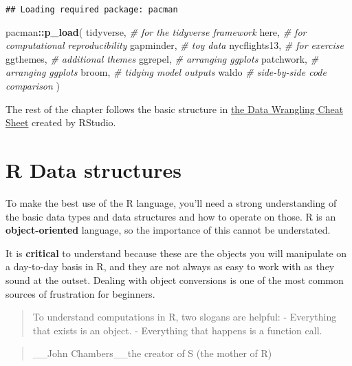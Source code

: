 \documentclass[
]{book}
\newenvironment{Shaded}{\begin{snugshade}}{\end{snugshade}}
\newcommand{\CommentTok}[1]{\textcolor[rgb]{0.56,0.35,0.01}{\textit{#1}}}
\newcommand{\KeywordTok}[1]{\textcolor[rgb]{0.13,0.29,0.53}{\textbf{#1}}}
\newcommand{\NormalTok}[1]{#1}
\newcommand{\OperatorTok}[1]{\textcolor[rgb]{0.81,0.36,0.00}{\textbf{#1}}}
\begin{document}
\begin{verbatim}
## Loading required package: pacman
\end{verbatim}

\begin{Shaded}
\begin{Highlighting}[]
\NormalTok{pacman}\OperatorTok{::}\KeywordTok{p\_load}\NormalTok{(}
\NormalTok{  tidyverse, }\CommentTok{\# for the tidyverse framework}
\NormalTok{  here, }\CommentTok{\# for computational reproducibility}
\NormalTok{  gapminder, }\CommentTok{\# toy data}
\NormalTok{  nycflights13, }\CommentTok{\# for exercise}
\NormalTok{  ggthemes, }\CommentTok{\# additional themes}
\NormalTok{  ggrepel, }\CommentTok{\# arranging ggplots}
\NormalTok{  patchwork, }\CommentTok{\# arranging ggplots}
\NormalTok{  broom, }\CommentTok{\# tidying model outputs}
\NormalTok{  waldo }\CommentTok{\# side{-}by{-}side code comparison}
\NormalTok{)}
\end{Highlighting}
\end{Shaded}

The rest of the chapter follows the basic structure in \href{https://rstudio.com/wp-content/uploads/2015/02/data-wrangling-cheatsheet.pdf}{the Data Wrangling Cheat Sheet} created by RStudio.

\hypertarget{r-data-structures}{%
\section{R Data structures}\label{r-data-structures}}

To make the best use of the R language, you'll need a strong understanding of the basic data types and data structures and how to operate on those. R is an \textbf{object-oriented} language, so the importance of this cannot be understated.

It is \textbf{critical} to understand because these are the objects you will manipulate on a day-to-day basis in R, and they are not always as easy to work with as they sound at the outset. Dealing with object conversions is one of the most common sources of frustration for beginners.

\begin{quote}
To understand computations in R, two slogans are helpful:
- Everything that exists is an object.
- Everything that happens is a function call.
\end{quote}

\begin{quote}
\_\_John Chambers\_\_the creator of S (the mother of R)
\end{quote}
\end{document}
